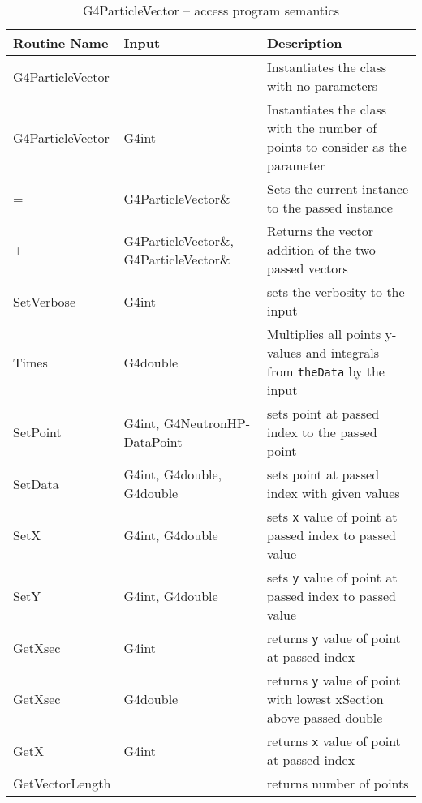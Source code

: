\documentclass[12pt]{article}
\begin{document}
\begin{longtable}{p{}p{}p{}}
\caption{G4ParticleVector -- access program semantics}\label{Table_NeutronHPVectorSemantics}\\
\toprule
\bf Routine Name & \bf Input & \bf Description \\\midrule
\arrayrulecolor{lightgray}
G4ParticleVector & & Instantiates the class with no parameters\\ \hline
G4ParticleVector & G4int & Instantiates the class with the number of points to consider as the parameter\\\hline
= & G4ParticleVector\& & Sets the current instance to the passed instance\\\hline
+ & G4ParticleVector\&, G4ParticleVector\& & Returns the vector addition of the two passed vectors\\\hline
SetVerbose & G4int & sets the verbosity to the input\\\hline
Times & G4double & Multiplies all points y-values and integrals from \texttt{theData} by the input\\\hline
SetPoint & G4int, G4NeutronHP-DataPoint & sets point at passed index to the passed point\\\hline
SetData & G4int, G4double, G4double & sets point at passed index with given values\\\hline
SetX & G4int, G4double &  sets \texttt{x} value of point at passed index to passed value\\\hline
SetY & G4int, G4double &  sets \texttt{y} value of point at passed index to passed value\\\hline
GetXsec & G4int & returns \texttt{y} value of point at passed index\\\hline
GetXsec & G4double & returns \texttt{y} value of point with lowest xSection above passed double\\\hline
GetX & G4int & returns \texttt{x} value of point at passed index\\\hline
GetVectorLength & & returns number of points\\\hline

\end{longtable}
\end{document}
